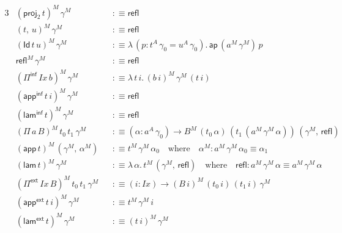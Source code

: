 \documentclass[12pt,a4paper,twoside,openany]{book}
\theoremstyle{remark}
\theoremstyle{definition}
\theoremstyle{theorem}
\newcommand{\mi}[1]{\mathit{#1}}
\newcommand{\ms}[1]{\mathsf{#1}}
\newcommand{\ap}{\ms{ap}}
\newcommand{\refl}{\mathsf{refl}}
\newcommand{\Id}{\mathsf{Id}}
\newcommand{\proj}{\mathsf{proj}}
\newcommand{\Pie}{\Pi^{\mathsf{ext}}}
\newcommand{\appe}{\mathsf{app^{ext}}}
\newcommand{\lame}{\mathsf{lam^{ext}}}
\newcommand{\Piinf}{\Pi^{\mathsf{inf}}}
\newcommand{\appinf}{\mathsf{app^{inf}}}
\newcommand{\laminf}{\mathsf{lam^{inf}}}
\newcommand{\app}{\ms{app}}
\newcommand{\lam}{\ms{lam}}
\newcommand{\defn}{:\equiv}
\begin{document}
\begin{alignat*}{3}
  &(\proj_2\,t)^M\,\gamma^M &&\defn \refl\\
  &(t,\,u)^M\,\gamma^M &&\defn \refl \\
  &(\Id\,t\,u)^M\,\gamma^M &&\defn \lambda\,(p : t^A\,\gamma_0 = u^A\,\gamma_0).\,\ap\,(a^M\,\gamma^M)\,p\\
  &\refl^M\,\gamma^M &&\defn \refl\\
  &(\Piinf\,\mi{Ix}\,b)^M\,\gamma^M &&\defn \lambda\,t\,i.\,(b\,i)^M\,\gamma^M\,(t\,i)\\
  &(\appinf\,t\,i)^M\,\gamma^M &&\defn \refl \\
  &(\laminf\,t)^M\,\gamma^M &&\defn \refl \\
  &(\Pi\,a\,B)^M\,t_0\,t_1\,\gamma^M &&\defn (\alpha : a^A\,\gamma_0) \to B^M\,(t_0\,\alpha)\,(t_1\,(a^M\,\gamma^M\,\alpha))\,(\gamma^M,\,\refl)\\
  &(\app\,t)^M\,(\gamma^M,\,\alpha^M) &&\defn t^M\,\gamma^M\,\alpha_0\hspace{1em}\text{where}\hspace{1em} \alpha^M : a^M\,\gamma^M\,\alpha_0 \equiv \alpha_1\\
  &(\lam\,t)^M\,\gamma^M &&\defn \lambda\,\alpha.\,t^M\,(\gamma^M,\,\refl)\hspace{1em}\text{where}\hspace{1em} \refl : a^M\,\gamma^M\,\alpha \equiv a^M\,\gamma^M\,\alpha\\
  &(\Pie\,\mi{Ix}\,B)^M\,t_0\,t_1\,\gamma^M &&\defn (i : \mi{Ix}) \to (B\,i)^M\,(t_0\,i)\,(t_1\,i)\,\gamma^M\\
  &(\appe\,t\,i)^M\,\gamma^M &&\defn t^M\,\gamma^M\,i\\
  &(\lame\,t)^M\,\gamma^M &&\defn (t\,i)^M\,\gamma^M
\end{alignat*}
\end{document}
